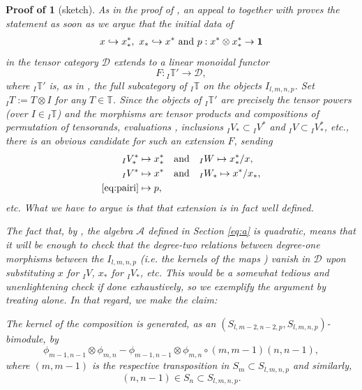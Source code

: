 \documentclass[11pt]{article}
\theoremstyle{plain}
\theoremstyle{nonumberplain}
\theoremstyle{plain}
\numberwithin{equation}{section}
\theoremstyle{nonumberplain}
\newcommand\pf[1]{\newtheorem{#1}{Proof of \Cref{#1}}}
\newcommand\bT{{\mathbb T}}
\newcommand\cD{{\mathcal D}}
\newcommand\1{{\bf 1}}
\begin{document}
\pf{th:sl-univ}
\begin{th:sl-univ}[sketch]
  As in the proof of \cite[Theorem 3.23]{us0}, an appeal to \cite[Theorem 2.22]{us0} together with  proves the statement as soon as we argue that the initial data of
  \begin{align*}
    x\hookrightarrow x_*^*, ~x_*\hookrightarrow x^*\text{ and}~p:x^*\otimes x_*^*\to {\bf 1}
  \end{align*}
  in the tensor category $\cD$ extends to a linear monoidal functor
  \begin{equation*}
    F:{}_I\bT'\to \cD,
  \end{equation*}
  where ${}_I\bT'$ is, as in , the full subcategory of ${}_I\bT$ on the objects $I_{l,m,n,p}$. Set ${}_I T:=T\otimes I$ for any $T\in \bT$. Since the objects of ${}_I\bT'$ are precisely the tensor powers (over $I\in {}_I\bT$) and the morphisms are tensor products and compositions of permutation of tensorands, evaluations , inclusions ${}_IV_*\subset {}_IV^*$ and ${}_IV\subset {}_IV_*^*$, etc., there is an obvious candidate for such an extension $F$, sending
  \begin{align*}
    {}_IV_*^*&\mapsto x_*^*\quad\text{and}\quad {}_IW\mapsto x_*^*/x,\\
    {}_IV^*&\mapsto x^*\quad\text{and}\quad {}_IW_*\mapsto x^*/x_*,\\
    \text{\Cref{eq:pairi}}&\mapsto p,
  \end{align*}
  etc. What we have to argue is that that extension is in fact well defined.

  The fact that, by , the algebra $\mathcal{A}$ defined in Section \ref{eq:a} is quadratic, means that it will be enough to check that the degree-two relations between degree-one morphisms between the $I_{l,m,n,p}$ (i.e. the kernels of the maps ) vanish in $\cD$ upon substituting $x$ for ${}_IV$, $x_*$ for ${}_IV_*$, etc. This would be a somewhat tedious and unenlightening check if done exhaustively, so we exemplify the argument by treating  alone. In that regard, we make the claim:

 {\it The kernel of the composition  is generated, as an $(S_{l,m-2,n-2,p},S_{l,m,n,p})$-bimodule, by
    \begin{equation}\label{eq:inker}
      \phi_{m-1,n-1}\otimes \phi_{m,n} - \phi_{m-1,n-1}\otimes \phi_{m,n}\circ (m,m-1)(n,n-1),
    \end{equation}
    where $(m,m-1)$ is the respective transposition in $S_m\subset S_{l,m,n,p}$ and similarly,
    \begin{equation*}
      (n,n-1)\in S_n\subset S_{l,m,n,p}. 
    \end{equation*}
  }
  

\end{th:sl-univ}
\end{document}
